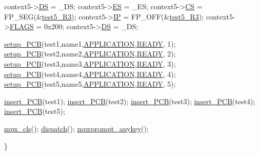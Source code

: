 \begin{DoxyCode}
        context5->\hyperlink{structcontext_a657e73663a4443be61a078d31c28ee3e}{DS} = \_DS;
        context5->\hyperlink{structcontext_a81a78fef7bda3a5dd852b28a905890ab}{ES} = \_ES;
        context5->\hyperlink{structcontext_a0b41903d1fa3b4e1ce892f59480323b5}{CS} = FP\_SEG(&\hyperlink{procs-r3_8c_abe909889e9cb85d683914b291867a6e6}{test5_R3});
        context5->\hyperlink{structcontext_a02ac427e75af0dfe7d649dc8821cde0a}{IP} = FP\_OFF(&\hyperlink{procs-r3_8c_abe909889e9cb85d683914b291867a6e6}{test5_R3});
        context5->\hyperlink{structcontext_a251dc5ae40a989bef945d2df6925f9a3}{FLAGS} = 0x200;
        context5->\hyperlink{structcontext_a657e73663a4443be61a078d31c28ee3e}{DS} = \_DS;
        
        \hyperlink{mpx__r2_8c_a316c9619aba53c03c17afbc0a0dbf096}{setup_PCB}(test1,name1,\hyperlink{mpx__r2_8h_a796bd7c6ba2e59281760fb155c6287e8}{APPLICATION},\hyperlink{mpx__r2_8h_ad1235d5ce36f7267285e82dccd428aa6}{READY}, 1);
        \hyperlink{mpx__r2_8c_a316c9619aba53c03c17afbc0a0dbf096}{setup_PCB}(test2,name2,\hyperlink{mpx__r2_8h_a796bd7c6ba2e59281760fb155c6287e8}{APPLICATION},\hyperlink{mpx__r2_8h_ad1235d5ce36f7267285e82dccd428aa6}{READY}, 2);
        \hyperlink{mpx__r2_8c_a316c9619aba53c03c17afbc0a0dbf096}{setup_PCB}(test3,name3,\hyperlink{mpx__r2_8h_a796bd7c6ba2e59281760fb155c6287e8}{APPLICATION},\hyperlink{mpx__r2_8h_ad1235d5ce36f7267285e82dccd428aa6}{READY}, 3);
        \hyperlink{mpx__r2_8c_a316c9619aba53c03c17afbc0a0dbf096}{setup_PCB}(test4,name4,\hyperlink{mpx__r2_8h_a796bd7c6ba2e59281760fb155c6287e8}{APPLICATION},\hyperlink{mpx__r2_8h_ad1235d5ce36f7267285e82dccd428aa6}{READY}, 4);
        \hyperlink{mpx__r2_8c_a316c9619aba53c03c17afbc0a0dbf096}{setup_PCB}(test5,name5,\hyperlink{mpx__r2_8h_a796bd7c6ba2e59281760fb155c6287e8}{APPLICATION},\hyperlink{mpx__r2_8h_ad1235d5ce36f7267285e82dccd428aa6}{READY}, 5);

        \hyperlink{mpx__r2_8c_aa3b334e3a5afd6e590917667ad359a6f}{insert_PCB}(test1);
        \hyperlink{mpx__r2_8c_aa3b334e3a5afd6e590917667ad359a6f}{insert_PCB}(test2);
        \hyperlink{mpx__r2_8c_aa3b334e3a5afd6e590917667ad359a6f}{insert_PCB}(test3);
        \hyperlink{mpx__r2_8c_aa3b334e3a5afd6e590917667ad359a6f}{insert_PCB}(test4);
        \hyperlink{mpx__r2_8c_aa3b334e3a5afd6e590917667ad359a6f}{insert_PCB}(test5);
        
        
        \hyperlink{mpx__util_8c_a8cf3281978ba1652fd5d643e1a41f70b}{mpx_cls}();
        \hyperlink{mpx__r3_8c_ad4150c832feb766384417ab7bae70089}{dispatch}();
        \hyperlink{mpx__util_8c_a338d01dfe3c80732c00450203c85b964}{mpxprompt_anykey}();
        
\}
\end{DoxyCode}


